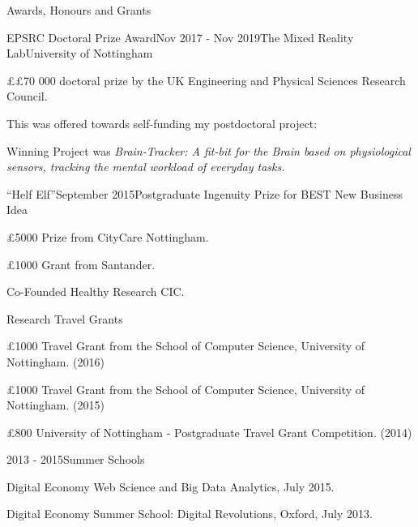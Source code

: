 \documentclass{resume} %
\begin{document}
\begin{rSection}{Awards, Honours and Grants}
	  
	  \begin{rSubsection}{EPSRC Doctoral Prize Award}{Nov 2017 - Nov 2019}{The Mixed Reality Lab}{University of Nottingham }
		\item \pounds £70 000 doctoral prize by the  UK Engineering and Physical Sciences Research Council.
		\item This was offered towards self-funding my postdoctoral project:
		\item Winning Project  was \textit{Brain-Tracker: A fit-bit for the Brain based on physiological sensors, tracking the mental workload of everyday tasks.}
	\end{rSubsection}


    \begin{rSubsection}{``Helf Elf''}{September 2015}{Postgraduate Ingenuity Prize for BEST New Business Idea}{}
        \item \pounds 5000 Prize from CityCare Nottingham.
        \item \pounds 1000 Grant from Santander.
        \item Co-Founded Healthy Research CIC.
    \end{rSubsection}
\vspace{-4mm}
    \begin{rSubsection}{}{}{Research Travel Grants}{}
        \item \pounds 1000 Travel Grant from the School of Computer Science, University of Nottingham. (2016)
        \item \pounds 1000 Travel Grant from the School of Computer Science, University of Nottingham. (2015)
        \item \pounds 800 University of Nottingham - Postgraduate Travel Grant Competition. (2014)
    \end{rSubsection}
\vspace{-4 mm}
    \begin{rSubsection}{}{2013 - 2015}{Summer Schools}{}
        \item Digital Economy Web Science and Big Data Analytics, July 2015.
        \item Digital Economy Summer School: Digital Revolutions, Oxford, July 2013.
    \end{rSubsection}

\end{rSection}
\end{document}
